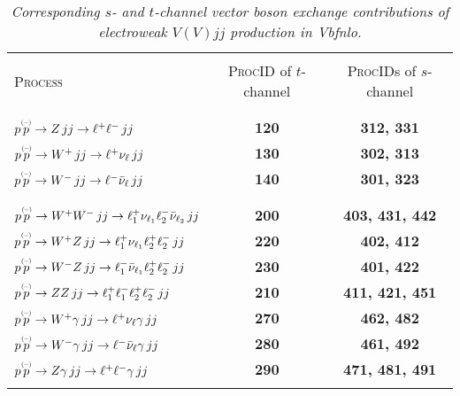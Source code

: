 \documentclass[english,12pt]{article}
\begin{document}
\begin{table}[t!]
\newcommand{\lstrut}{{$\strut\atop\strut$}}
\begin{center}
\small
\begin{tabular}{l|c|c}
\hline
&\\
\textsc{Process} & \textsc{ProcID} of $t$-channel & \textsc{ProcID}s of $s$-channel \\
&\\
\hline
&\\
$p \overset{\mbox{\tiny{(--)}}}{p} \to Z \, jj \to \ell^{+} \ell^{-} \, jj$            & \bf 120 & \bf 312, 331 \\
$p \overset{\mbox{\tiny{(--)}}}{p} \to W^{+} \, jj \to \ell^{+} \nu_\ell \, jj$        & \bf 130 & \bf 302, 313 \\
$p \overset{\mbox{\tiny{(--)}}}{p} \to W^{-} \, jj \to \ell^{-} \bar{\nu}_\ell  \, jj$ & \bf 140 & \bf 301, 323 \\
&\\
\hline
&\\
$p \overset{\mbox{\tiny{(--)}}}{p} \to W^{+}W^{-} \, jj \to \ell_{1}^{+} \nu_{\ell_{1}} \ell_{2}^{-} \bar{\nu}_{\ell_{2}} \, jj$ 
& \bf 200 & \bf 403, 431, 442 \\
$p \overset{\mbox{\tiny{(--)}}}{p} \to W^{+}Z \,  jj\to \ell_{1}^{+} \nu_{\ell_{1}} \ell_{2}^{+} \ell_{2}^{-} \, jj$
& \bf 220 & \bf 402, 412 \\
$p \overset{\mbox{\tiny{(--)}}}{p} \to W^{-}Z \, jj\to \ell_{1}^{-} \bar{\nu}_{\ell _{1}} \ell_{2}^{+} \ell_{2}^{-} \, jj$
& \bf 230 & \bf 401, 422 \\
$p \overset{\mbox{\tiny{(--)}}}{p} \to ZZ  \, jj\to \ell_{1}^{+} \ell_{1}^{-} \ell_{2}^{+} \ell_{2}^{-} \, jj$ 
& \bf 210 & \bf 411, 421, 451 \\
$p \overset{\mbox{\tiny{(--)}}}{p} \to W^{+} \gamma \,  jj\to \ell^{+} \nu_{\ell} \gamma \, jj$
& \bf 270 & \bf 462, 482 \\
$p \overset{\mbox{\tiny{(--)}}}{p} \to W^{-} \gamma \, jj\to \ell^{-} \bar{\nu}_{\ell} \gamma \, jj$
& \bf 280 & \bf 461, 492 \\
$p \overset{\mbox{\tiny{(--)}}}{p} \to Z \gamma \,  jj\to \ell^{+} \ell^{-} \gamma \, jj$
& \bf 290 & \bf 471, 481, 491 \\
&\\
\hline
\end{tabular}
\caption {\em Corresponding $s$- and $t$-channel vector boson exchange contributions of electroweak $V(V)jj$ production in {\sc Vbfnlo}.}
\vspace{0.2cm}
\label{tab:schannel}
\end{center}
\end{table}
\end{document}

